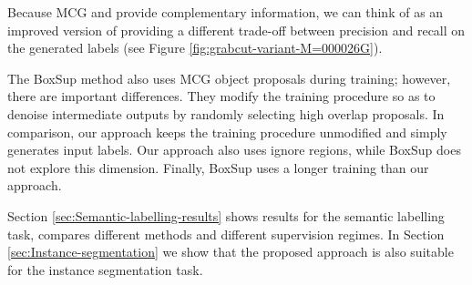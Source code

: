 \documentclass[10pt,english,british,twocolumn]{article}
\begin{document}
Because MCG and provide complementary information,
we can think of  as an improved version
of  providing a different trade-off between
precision and recall on the generated labels (see Figure \ref{fig:grabcut-variant-M=000026G}). 

The BoxSup method \cite{Dai2015Iccv} also uses MCG object proposals
during training; however, there are important differences. They modify
the training procedure so as to denoise intermediate outputs by randomly
selecting high overlap proposals. In comparison, our approach keeps
the training procedure unmodified and simply generates input labels.
Our approach also uses ignore regions, while BoxSup does not explore
this dimension. Finally, BoxSup uses a longer training than our approach.

Section \ref{sec:Semantic-labelling-results} shows results for the
semantic labelling task, compares different methods and different
supervision regimes. In Section \ref{sec:Instance-segmentation} we
show that the proposed approach is also suitable for the instance
segmentation task. 
\end{document}
